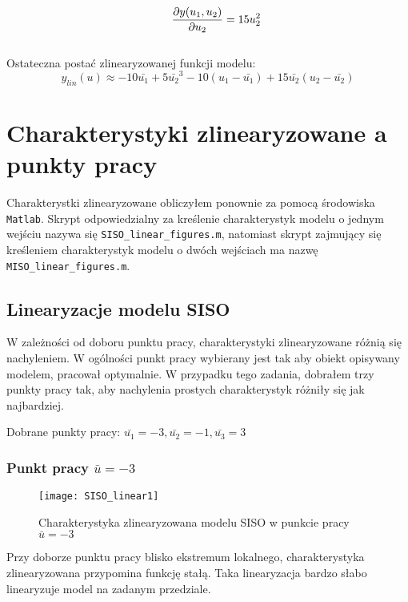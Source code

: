 \documentclass[11pt,a4paper]{article}
\begin{document}
\begin{eqnarray*}
\indent \frac{\partial y(u_{1}, u_{2})}{\partial{u_{2}}} = 15u_{2}^2
\end{eqnarray*}
\\
Ostateczna postać zlinearyzowanej funkcji modelu:
\begin{equation}
y_{lin}(u) \approx -10\bar{u_{1}} + 5\bar{u_{2}}^3 - 10(u_{1} - \bar{u_{1}}) + 15\bar{u_{2}}(u_{2} - \bar{u_{2}})
\label{eqn:wzor7}
\end{equation}
\newpage

\section{Charakterystyki zlinearyzowane a punkty pracy}
\indent \indent Charakterystki zlinearyzowane obliczyłem ponownie za pomocą środowiska \texttt{Matlab}. Skrypt odpowiedzialny za kreślenie charakterystyk modelu o jednym wejściu nazywa się \texttt{SISO\_linear\_figures.m}, natomiast skrypt zajmujący się kreśleniem charakterystyk modelu o dwóch wejściach ma nazwę \texttt{MISO\_linear\_figures.m}.

\subsection{Linearyzacje modelu SISO} 
\indent \indent W zależności od doboru punktu pracy, charakterystyki zlinearyzowane różnią się nachyleniem. W ogólności punkt pracy wybierany jest tak aby obiekt opisywany modelem, pracował optymalnie. W przypadku tego zadania, dobrałem trzy punkty pracy tak, aby nachylenia prostych charakterystyk różniły się jak najbardziej.
\begin{center}
Dobrane punkty pracy: $\bar{u_{1}} = -3, \bar{u_{2}} = -1, \bar{u_{3}} = 3$
\end{center}
\flushleft

\subsubsection{Punkt pracy $\bar{u} = -3$}

\begin{figure}[h]
\texttt{[image: SISO\_linear1]}
\caption{Charakterystyka zlinearyzowana modelu SISO w punkcie pracy $\bar{u} = -3$}
\end{figure}
\indent \indent Przy doborze punktu pracy blisko ekstremum lokalnego, charakterystyka zlinearyzowana przypomina funkcję stałą. Taka linearyzacja bardzo słabo linearyzuje model na zadanym przedziale. 
\newpage
\end{document}
